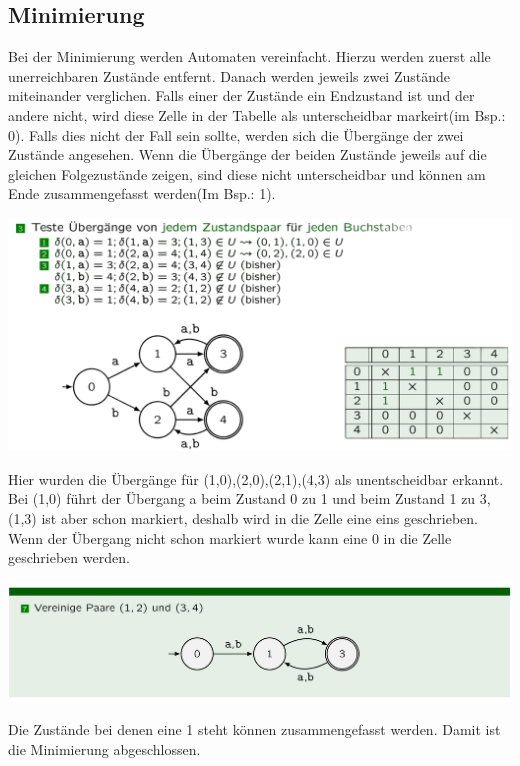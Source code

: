 \documentclass[12pt,a4paper]{article}
\begin{document}
	\subsection{Minimierung}
	Bei der Minimierung werden Automaten vereinfacht. Hierzu werden zuerst alle unerreichbaren Zustände entfernt. Danach werden jeweils zwei Zustände miteinander verglichen. Falls einer der Zustände ein Endzustand ist und der andere nicht, wird diese Zelle in der Tabelle als unterscheidbar markeirt(im Bsp.: 0). Falls dies nicht der Fall sein sollte, werden sich die Übergänge der zwei Zustände angesehen. Wenn die Übergänge der beiden Zustände jeweils auf die gleichen Folgezustände zeigen, sind diese nicht unterscheidbar und können am Ende zusammengefasst werden(Im Bsp.: 1).\newline
	\begin{center}
			\includegraphics[width=\textwidth]{Bilder/MinimizingUbergangBsp.png}
	\end{center}
	Hier wurden die Übergänge für (1,0),(2,0),(2,1),(4,3) als unentscheidbar erkannt. Bei (1,0) führt der Übergang a beim Zustand 0 zu 1 und beim Zustand 1 zu 3, (1,3) ist aber schon markiert, deshalb wird in die Zelle eine eins geschrieben. Wenn der Übergang nicht schon markiert wurde kann eine 0 in die Zelle geschrieben werden.\newline
	\begin{center}
	\includegraphics[width=\textwidth]{Bilder/MinimizingVereinigung.png}
	\end{center}
	Die Zustände bei denen eine 1 steht können zusammengefasst werden. Damit ist die Minimierung abgeschlossen.
\end{document}
